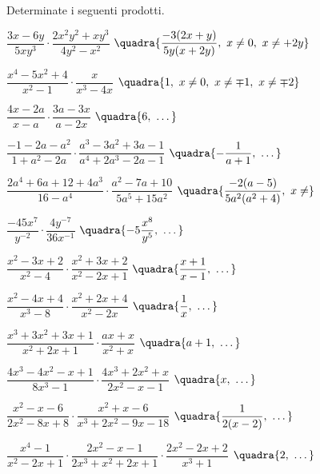 \begin{esercizio}[\Ast]
\label{ese:19.13}
Determinate i seguenti prodotti.
\begin{enumeratea}
 \item \(\dfrac{3x-6y}{5xy^{3}} \cdot
         \dfrac{2x^{2}y^{2}+xy^{3}}{4y^{2}-x^{2}}\)
 \hfill {\footnotesize \(\quadra{\dfrac{-{3(2x+y)}}{5y(x+2y)},~ 
                                 x \neq 0,~x \neq +2y}\)}
 \item \(\dfrac{x^{4}-5x^{2}+4}{x^{2}-1}\cdot\dfrac{x}{x^{3}-4x}\)
 \hfill {\footnotesize \(\quadra{1,~ x \neq 0,~ x \neq \mp 1,~ x \neq \mp 2}\)}
 \item \(\dfrac{4x-2a}{x-a}\cdot\dfrac{3a-3x}{a-2x}\)
 \hfill {\footnotesize \(\quadra{6,~\dots}\)}
 \item \(\dfrac{-1-2a-a^{2}}{1+a^{2}-2a}\cdot
        \dfrac{a^{3}-3a^{2}+3a-1}{a^{4}+2a^{3}-2a-1}\)
 \hfill {\footnotesize \(\quadra{-{\dfrac{1}{a+1}},~\dots}\)}
 \item \(\dfrac{2a^{4}+6a+12+4a^{3}}{16-a^{4}}\cdot
        \dfrac{a^{2}-7a+10}{5a^{5}+15a^{2}}\)
 \hfill {\footnotesize \(\quadra{\dfrac{-{2(a-5)}}{5a^{2}(a^{2}+4)},~ x \neq 
}\)}
 \item \(\dfrac{-45x^{7}}{y^{-2}}\cdot\dfrac{4y^{-7}}{36x^{-1}}\)
 \hfill {\footnotesize \(\quadra{-5\dfrac{x^{8}}{y^{5}},~\dots}\)}
 \item \(\dfrac{x^{2}-3x+2}{x^{2}-4}\cdot\dfrac{x^{2}+3x+2}{x^{2}-2x+1}\)
 \hfill {\footnotesize \(\quadra{\dfrac{x+1}{x-1},~\dots}\)}
 \item \(\dfrac{x^{2}-4x+4}{x^{3}-8}\cdot\dfrac{x^{2}+2x+4}{x^{2}-2x}\)
 \hfill {\footnotesize \(\quadra{\dfrac{1}{x},~\dots}\)}
 \item \(\dfrac{x^{3}+3x^{2}+3x+1}{x^{2}+2x+1}\cdot \dfrac{ax+x}{x^{2}+x}\)
 \hfill {\footnotesize \(\quadra{a+1,~\dots}\)}
 \item \(\dfrac{4x^{3}-4x^{2}-x+1}{8x^{3}-1}\cdot
        \dfrac{4x^{3}+2x^{2}+x}{2x^{2}-x-1}\)
 \hfill {\footnotesize \(\quadra{x,~\dots}\)}
 \item \(\dfrac{x^{2}-x-6}{2x^{2}-8x+8}\cdot
        \dfrac{x^{2}+x-6}{x^{3}+2x^{2}-9x-18}\)
 \hfill {\footnotesize \(\quadra{\dfrac{1}{2(x-2)},~\dots}\)}
 \item \(\dfrac{x^{4}-1}{x^{2}-2x+1}\cdot
        \dfrac{2x^{2}-x-1}{2x^{3}+x^{2}+2x+1}\cdot
        \dfrac{2x^{2}-2x+2}{x^{3}+1}\)
 \hfill {\footnotesize \(\quadra{2,~\dots}\)}
\end{enumeratea}
\end{esercizio}

